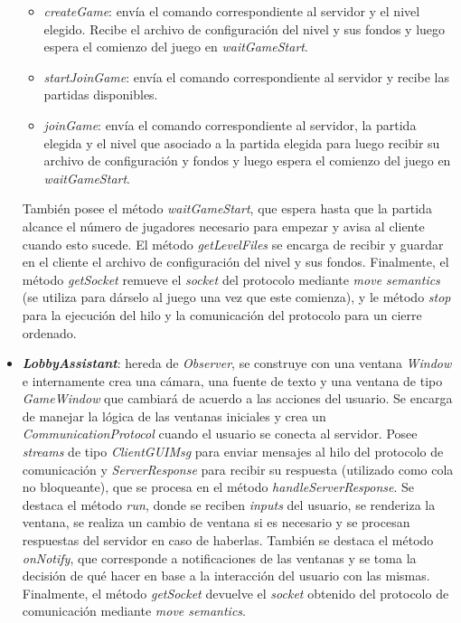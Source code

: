 \begin{itemize}
\begin{itemize}
		\item \textit{createGame}: envía el comando correspondiente al servidor y el nivel elegido. Recibe el archivo de configuración del nivel y sus fondos y luego espera el comienzo del juego en \textit{waitGameStart}.

		\item \textit{startJoinGame}: envía el comando correspondiente al servidor y recibe las partidas disponibles.

		\item \textit{joinGame}: envía el comando correspondiente al servidor, la partida elegida y el nivel que asociado a la partida elegida para luego recibir su archivo de configuración y fondos y luego espera el comienzo del juego en \textit{waitGameStart}.
	\end{itemize}
	También posee el método \textit{waitGameStart}, que espera hasta que la partida alcance el número de jugadores necesario para empezar y avisa al cliente cuando esto sucede. El método \textit{getLevelFiles} se encarga de recibir y guardar en el cliente el archivo de configuración del nivel y sus fondos. Finalmente, el método \textit{getSocket} remueve el \textit{socket} del protocolo mediante \textit{move semantics} (se utiliza para dárselo al juego una vez que este comienza), y le método \textit{stop} para la ejecución del hilo y la comunicación del protocolo para un cierre ordenado.

	\item \textbf{\textit{LobbyAssistant}}: hereda de \textit{Observer}, se construye con una ventana \textit{Window} e internamente crea una cámara, una fuente de texto y una ventana de tipo \textit{GameWindow} que cambiará de acuerdo a las acciones del usuario. Se encarga de manejar la lógica de las ventanas iniciales y crea un \textit{CommunicationProtocol} cuando el usuario se conecta al servidor. Posee \textit{streams} de tipo \textit{ClientGUIMsg} para enviar mensajes al hilo del protocolo de comunicación y \textit{ServerResponse} para recibir su respuesta (utilizado como cola no bloqueante), que se procesa en el método \textit{handleServerResponse}. Se destaca el método \textit{run}, donde se reciben \textit{inputs} del usuario, se renderiza la ventana, se realiza un cambio de ventana si es necesario y se procesan respuestas del servidor en caso de haberlas. También se destaca el método \textit{onNotify}, que corresponde a notificaciones de las ventanas y se toma la decisión de qué hacer en base a la interacción del usuario con las mismas. Finalmente, el método \textit{getSocket} devuelve el \textit{socket} obtenido del protocolo de comunicación mediante \textit{move semantics}.


\end{itemize}
